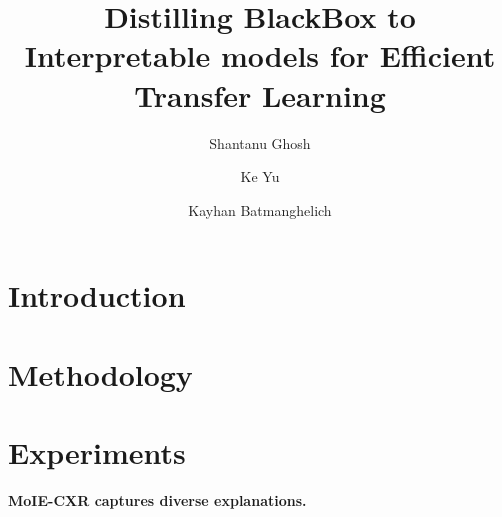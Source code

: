 \documentclass[runningheads]{llncs}
\begin{document}
%
\title{
Distilling BlackBox to Interpretable models for Efficient Transfer Learning
}
%
%
\author{Shantanu Ghosh\and
Ke Yu\and
Kayhan Batmanghelich}

%


%
\maketitle              %
%

%
%
\section{Introduction}

\label{sec:intro}

% 

\section{Methodology}
%

\label{sec:method}

\section{Experiments}

\label{sec:experiment}

\noindent \textbf{MoIE-CXR captures diverse explanations.}

\label{sec:qual_analysis}


\label{sec:quant_analysis}
\end{document}

